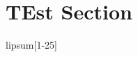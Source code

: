\documentclass{referencesheet}
\begin{document}
	\section{TEst Section}
	lipsum[1-25]
\end{document}
